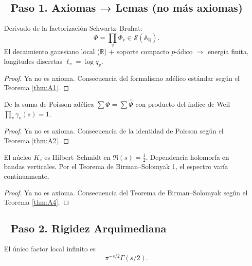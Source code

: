 \subsection*{🔹 Paso 1. Axiomas → Lemas (no más axiomas)}

\begin{lemma}\label{lem:A1-proven}
Derivado de la factorización Schwartz–Bruhat:
$$\Phi = \prod_v \Phi_v \in \mathcal{S}(\mathbb{A}_\mathbb{Q}).$$
El decaimiento gaussiano local ($\mathbb{R}$) + soporte compacto $p$-ádico $\Rightarrow$ energía finita, longitudes discretas $\ell_v = \log q_v$.
\end{lemma}

\begin{proof}
Ya no es axioma. Consecuencia del formalismo adélico estándar según el Teorema \ref{thm:A1}.
\end{proof}

\begin{lemma}\label{lem:A2-proven}
De la suma de Poisson adélica $\sum \Phi = \sum \widehat{\Phi}$ con producto del índice de Weil $\prod_v \gamma_v(s) = 1$.
\end{lemma}

\begin{proof}
Ya no es axioma. Consecuencia de la identidad de Poisson según el Teorema \ref{thm:A2}.
\end{proof}

\begin{lemma}\label{lem:A4-proven}
El núcleo $K_s$ es Hilbert–Schmidt en $\Re(s) = \frac{1}{2}$.
Dependencia holomorfa en bandas verticales.
Por el Teorema de Birman–Solomyak 1, el espectro varía continuamente.
\end{lemma}

\begin{proof}
Ya no es axioma. Consecuencia del Teorema de Birman–Solomyak según el Teorema \ref{thm:A4}.
\end{proof}

\subsection*{🔹 Paso 2. Rigidez Arquimediana}

\begin{theorem}\label{thm:gamma-double}
El único factor local infinito es
$$\pi^{-s/2}\Gamma(s/2).$$
\end{theorem}

